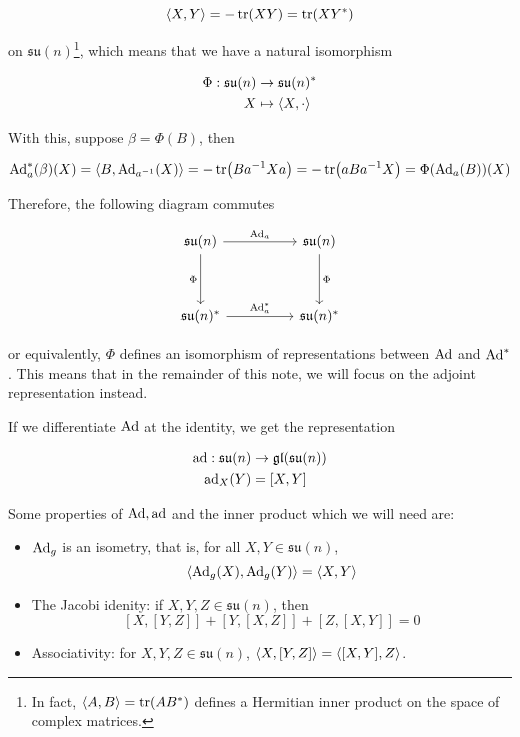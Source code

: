 \documentclass{article}
\newcommand{\su}{\mathfrak{su}}
\begin{document}
\[\left\langle X, Y \right\rangle = -\tr(XY) = \tr(XY^*)\]

on \(\su(n)\)\footnote{In fact, \(\left\langle A, B \right\rangle = \tr(AB^*)\) defines a Hermitian inner product on the space of complex matrices.}, which means that we have a natural isomorphism

\begin{align*}
    \Phi : \su(n) &\to \su(n)^* \\
    X &\mapsto \inner{X, \cdot}
\end{align*}

With this, suppose \(\beta = \Phi(B)\), then

\[\operatorname{Ad}_a^*(\beta)(X) = \left\langle B, \operatorname{Ad}_{a^{-1}}(X) \right\rangle = -\tr(Ba^{-1}Xa) = -\tr(aBa^{-1}X) = \Phi(\operatorname{Ad}_a(B))(X)\]

Therefore, the following diagram commutes

\[\begin{tikzcd}
	{\su(n)} && {\su(n)} \\
	\\
	{\su(n)^*} && {\su(n)^*}
	\arrow["{\Ad_a^*}", from=3-1, to=3-3]
	\arrow["{\Ad_a}", from=1-1, to=1-3]
	\arrow["\Phi"', from=1-1, to=3-1]
	\arrow["\Phi", from=1-3, to=3-3]
\end{tikzcd}\]

or equivalently, \(\Phi\) defines an isomorphism of representations between \(\operatorname{Ad}\) and \(\operatorname{Ad}^*\). This means that in the remainder of this note, we will focus on the adjoint representation instead.

If we differentiate \(\operatorname{Ad}\) at the identity, we get the representation

\begin{align*}
    \ad : \su(n) &\to \gl(\su(n))\\
    \ad_X(Y) &= [X, Y]
\end{align*}

Some properties of \(\operatorname{Ad}, \operatorname{ad}\) and the inner product which we will need are:

\begin{itemize}
    \item \(\operatorname{Ad}_g\) is an isometry, that is, for all \(X, Y \in \su(n)\), \[\left\langle \operatorname{Ad}_g(X), \operatorname{Ad}_g(Y) \right\rangle = \left\langle X, Y \right\rangle\]
    \item The Jacobi idenity: if \(X, Y, Z \in \su(n)\), then \[[X, [Y, Z]] + [Y, [X, Z]] + [Z, [X, Y]] = 0\]
    \item Associativity: for \(X, Y, Z \in \su(n)\), \(\left\langle X, [Y, Z] \right\rangle = \left\langle [X, Y], Z \right\rangle\).
\end{itemize}
\end{document}
